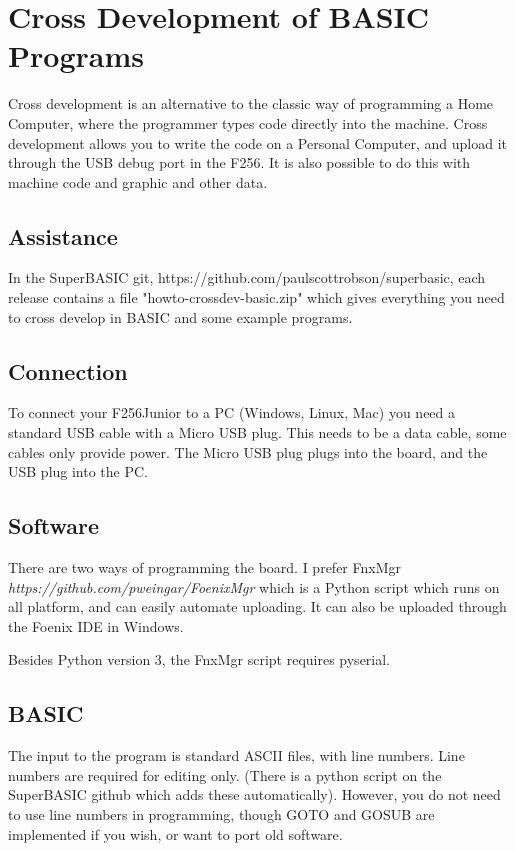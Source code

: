 \chapter{Cross Development of BASIC Programs}

Cross development is an alternative to the classic way of programming a Home Computer, where the programmer types code directly into the machine. Cross development allows you to write the code on a Personal Computer, and upload it through the USB debug port in the F256. It is also possible to do this with machine code and graphic and other data.

\section{Assistance}

In the SuperBASIC git, https://github.com/paulscottrobson/superbasic, each release contains a file "howto-crossdev-basic.zip" which gives everything you need to cross develop in BASIC and some example programs.

\section{Connection}

To connect your F256Junior to a PC (Windows, Linux, Mac) you need a standard USB cable with a Micro USB plug. This needs to be a data cable, some cables only provide power. The Micro USB plug plugs into the board, and the USB plug into the PC.

\section{Software}

There are two ways of programming the board. I prefer FnxMgr \emph{https://github.com/pweingar/FoenixMgr} which is a Python script which runs on all platform, and can easily automate uploading. It can also be uploaded through the Foenix IDE in Windows\underline{}.

Besides Python version 3, the FnxMgr script requires pyserial.

\section{BASIC}

The input to the program is standard ASCII files, with line numbers. Line numbers are required for editing only. (There is a python script on the SuperBASIC github which adds these automatically). However, you do not need to use line numbers in programming, though GOTO and GOSUB are implemented if you wish, or want to port old software.

